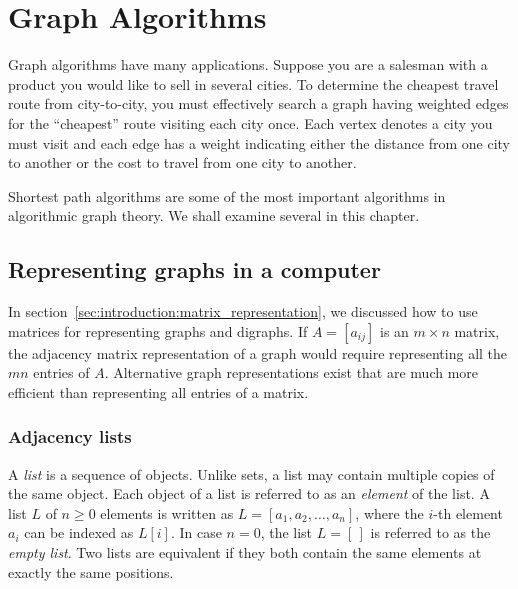 
\chapter{Graph Algorithms}
\label{chap:graph_algorithms}

Graph algorithms have many applications. Suppose you are a salesman
with a product you would like to sell in several cities. To determine
the cheapest travel route from city-to-city, you must effectively
search a graph having weighted edges for the ``cheapest'' route
visiting each city once. Each vertex denotes a city you must visit and
each edge has a weight indicating either the distance from one city to
another or the cost to travel from one city to another.

Shortest path algorithms are some of the most important algorithms in
algorithmic graph theory. We shall examine several in this chapter.



\section{Representing graphs in a computer}

In section~\ref{sec:introduction:matrix_representation}, we discussed
how to use matrices for representing graphs and digraphs. If
$A = [a_{ij}]$ is an $m \times n$ matrix, the adjacency matrix
representation of a graph would require representing all the $mn$
entries of $A$. Alternative graph representations exist that are much
more efficient than representing all entries of a matrix.



\subsection{Adjacency lists}

A \emph{list} is a sequence of objects. Unlike sets, a list may
contain multiple copies of the same object. Each object of a list is
referred to as an \emph{element} of the list. A list $L$ of
$n \geq 0$ elements is written as $L = [a_1, a_2, \dots, a_n]$, where
the $i$-th element $a_i$ can be indexed as $L[i]$. In case $n = 0$,
the list $L = [\,]$ is referred to as the \emph{empty list}. Two lists
are equivalent if they both contain the same elements at exactly the
same positions.

